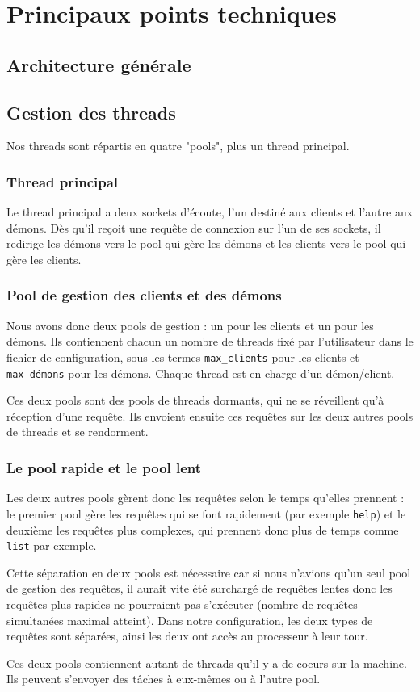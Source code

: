 \chapter{Principaux points techniques}


\section{Architecture générale}




\section{Gestion des threads}
Nos threads sont répartis en quatre "pools", plus un thread principal.

\subsection{Thread principal}
Le thread principal a deux sockets d'écoute, l'un destiné aux clients et
l'autre aux démons. Dès qu'il reçoit une requête de connexion sur l'un de
ses sockets, il redirige les démons vers le pool qui gère les démons et
les clients vers le pool qui gère les clients.

\subsection{Pool de gestion des clients et des démons}
Nous avons donc deux pools de gestion : un pour les clients et un pour
les démons. Ils contiennent chacun un nombre de threads fixé par
l'utilisateur dans le fichier de configuration, sous les termes 
\verb$max_clients$ pour les clients et \verb$max_démons$ pour les démons.
Chaque thread est en charge d'un démon/client.

Ces deux pools sont des pools de threads dormants, qui ne se réveillent qu'à 
réception d'une requête. Ils envoient ensuite ces requêtes sur les deux autres
pools de threads et se rendorment.

\subsection{Le pool rapide et le pool lent}
Les deux autres pools gèrent donc les requêtes selon le temps qu'elles 
prennent : le premier pool gère les requêtes qui se font rapidement 
(par exemple \verb$help$) et le deuxième les requêtes plus complexes, qui 
prennent donc plus de temps comme \verb$list$ par exemple.

Cette séparation en deux pools est nécessaire car si nous n'avions qu'un seul 
pool de gestion des requêtes, il aurait vite été surchargé de requêtes lentes
donc les requêtes plus rapides ne pourraient pas s'exécuter (nombre de requêtes
simultanées maximal atteint). Dans notre configuration, les deux types de 
requêtes sont séparées, ainsi les deux ont accès au processeur à leur tour.

Ces deux pools contiennent autant de threads qu'il y a de coeurs sur la
machine. Ils peuvent s'envoyer des tâches à eux-mêmes ou à l'autre pool.

